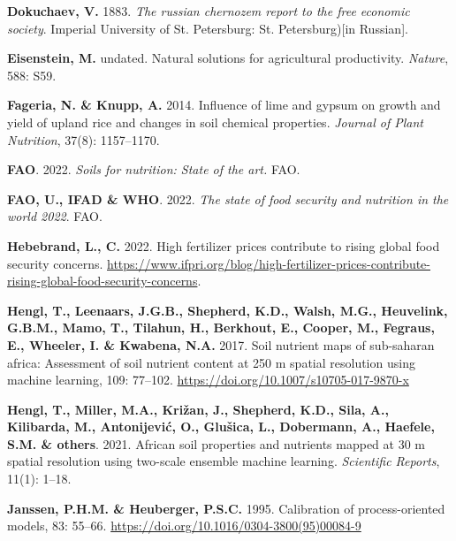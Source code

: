 \documentclass[
  10pt,
  b5paper,
  oneside]{book}
\newlength{\cslhangindent}
\newlength{\cslentryspacingunit} %
\newenvironment{CSLReferences}[2] %
 {%
  \setlength{\parindent}{0pt}
  \ifodd #1
  \let\oldpar\par
  \def\par{\hangindent=\cslhangindent\oldpar}
  \fi
  \setlength{\parskip}{#2\cslentryspacingunit}
 }%
 {}
\begin{document}
\begin{CSLReferences}{0}{0}
\leavevmode{}%
\textbf{Dokuchaev, V.} 1883. \emph{The russian chernozem report to the free economic society}. Imperial University of St. Petersburg: St. Petersburg){[}in Russian{]}.

\leavevmode{}%
\textbf{Eisenstein, M.} undated. Natural solutions for agricultural productivity. \emph{Nature}, 588: S59.

\leavevmode{}%
\textbf{Fageria, N. \& Knupp, A.} 2014. Influence of lime and gypsum on growth and yield of upland rice and changes in soil chemical properties. \emph{Journal of Plant Nutrition}, 37(8): 1157--1170.

\leavevmode{}%
\textbf{FAO}. 2022. \emph{Soils for nutrition: State of the art.} FAO.

\leavevmode{}%
\textbf{FAO, U., IFAD \& WHO}. 2022. \emph{The state of food security and nutrition in the world 2022}. FAO.

\leavevmode{}%
\textbf{Hebebrand, L., C.} 2022. High fertilizer prices contribute to rising global food security concerns. \url{https://www.ifpri.org/blog/high-fertilizer-prices-contribute-rising-global-food-security-concerns}.

\leavevmode{}%
\textbf{Hengl, T., Leenaars, J.G.B., Shepherd, K.D., Walsh, M.G., Heuvelink, G.B.M., Mamo, T., Tilahun, H., Berkhout, E., Cooper, M., Fegraus, E., Wheeler, I. \& Kwabena, N.A.} 2017. Soil nutrient maps of sub-saharan africa: Assessment of soil nutrient content at 250 m spatial resolution using machine learning, 109: 77--102. \url{https://doi.org/10.1007/s10705-017-9870-x}

\leavevmode{}%
\textbf{Hengl, T., Miller, M.A., Križan, J., Shepherd, K.D., Sila, A., Kilibarda, M., Antonijević, O., Glušica, L., Dobermann, A., Haefele, S.M. \& others}. 2021. African soil properties and nutrients mapped at 30 m spatial resolution using two-scale ensemble machine learning. \emph{Scientific Reports}, 11(1): 1--18.

\leavevmode{}%
\textbf{Janssen, P.H.M. \& Heuberger, P.S.C.} 1995. Calibration of process-oriented models, 83: 55--66. \url{https://doi.org/10.1016/0304-3800(95)00084-9}


\end{CSLReferences}
\end{document}
